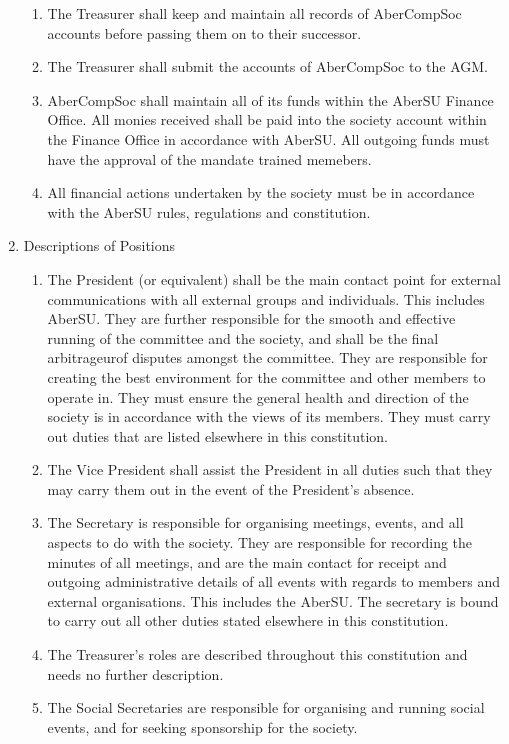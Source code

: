 \documentclass{article}
\begin{document}
\begin{enumerate}
\begin{enumerate}
            \item The Treasurer shall keep and maintain all records of AberCompSoc accounts before passing them on to their successor.
            \item The Treasurer shall submit the accounts of AberCompSoc to the AGM.
            \item AberCompSoc shall maintain all of its funds within the AberSU Finance Office. All monies received shall be paid into the society account within the Finance Office in accordance with AberSU. All outgoing funds must have the approval of the mandate trained memebers.
            \item All financial actions undertaken by the society must be in accordance with the AberSU rules, regulations and constitution.
        \end{enumerate}
    \item Descriptions of Positions
        \begin{enumerate}
            \item The President (or equivalent) shall be the main contact point for external communications with all external groups and individuals. This includes AberSU. They are further responsible for the smooth and effective running of the committee and the society, and shall be the final arbitrageurof disputes amongst the committee. They are responsible for creating the best environment for the committee and other members to operate in. They must ensure the general health and direction of the society is in accordance with the views of its members. They must carry out duties that are listed elsewhere in this constitution.
            \item The Vice President shall assist the President in all duties such that they may carry them out in the event of the President's absence.
            \item The Secretary is responsible for organising meetings, events, and all aspects to do with the society. They are responsible for recording the minutes of all meetings, and are the main contact for receipt and outgoing administrative details of all events with regards to members and external organisations. This includes the AberSU. The secretary is bound to carry out all other duties stated elsewhere in this constitution.
            \item The Treasurer’s roles are described throughout this constitution and needs no further description.
            \item The Social Secretaries are responsible for organising and running social events, and for seeking sponsorship for the society.

\end{enumerate}
\end{enumerate}
\end{document}
